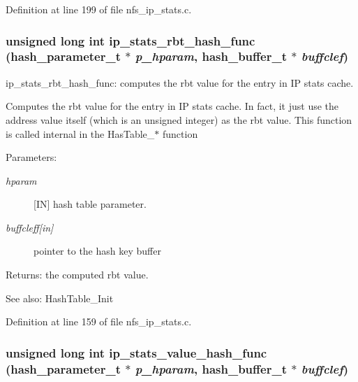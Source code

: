 Definition at line 199 of file nfs\_\-ip\_\-stats.c.
\subsubsection{\setlength{\rightskip}{0pt plus 5cm}unsigned long int ip\_\-stats\_\-rbt\_\-hash\_\-func (hash\_\-parameter\_\-t $\ast$ {\em p\_\-hparam}, hash\_\-buffer\_\-t $\ast$ {\em buffclef})}\label{nfs__ip__stats_8c_a3}


ip\_\-stats\_\-rbt\_\-hash\_\-func: computes the rbt value for the entry in IP stats cache.

Computes the rbt value for the entry in IP stats cache. In fact, it just use the address value itself (which is an unsigned integer) as the rbt value. This function is called internal in the Has\-Table\_\-$\ast$ function

\begin{Desc}
\item[Parameters:]
\begin{description}
\item[{\em hparam}][IN] hash table parameter. \item[{\em buffcleff\mbox{[}in\mbox{]}}]pointer to the hash key buffer\end{description}
\end{Desc}
\begin{Desc}
\item[Returns:]the computed rbt value.\end{Desc}
\begin{Desc}
\item[See also:]Hash\-Table\_\-Init \end{Desc}


Definition at line 159 of file nfs\_\-ip\_\-stats.c.
\subsubsection{\setlength{\rightskip}{0pt plus 5cm}unsigned long int ip\_\-stats\_\-value\_\-hash\_\-func (hash\_\-parameter\_\-t $\ast$ {\em p\_\-hparam}, hash\_\-buffer\_\-t $\ast$ {\em buffclef})}\label{nfs__ip__stats_8c_a2}


